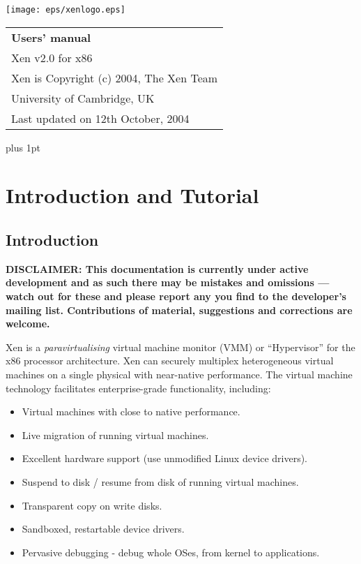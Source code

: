 \documentclass[11pt,twoside,final,openright]{xenstyle}
\begin{document}
\pagestyle{empty}
\begin{center}
\vspace*{\fill}
\texttt{[image: eps/xenlogo.eps]}
\vfill
\vfill
\vfill
\begin{tabular}{l}
{\Huge \bf Users' manual} \\[4mm]
{\huge Xen v2.0 for x86} \\[80mm]

{\Large Xen is Copyright (c) 2004, The Xen Team} \\[3mm]
{\Large University of Cambridge, UK} \\[20mm]
{\large Last updated on 12th October, 2004}
\end{tabular}
\vfill
\end{center}
\cleardoublepage

\pagestyle{plain}
{ \parskip 0pt plus 1pt
  \tableofcontents }
\cleardoublepage

\raggedbottom
{}
\parindent=0pt
\renewcommand{\topfraction}{.8}
\renewcommand{\bottomfraction}{.8}
\renewcommand{\textfraction}{.2}
\renewcommand{\floatpagefraction}{.8}

\newcommand{\path}[1]{{\tt #1}}

\part{Introduction and Tutorial}
\chapter{Introduction}

{\bf
DISCLAIMER: This documentation is currently under active development
and as such there may be mistakes and omissions --- watch out for
these and please report any you find to the developer's mailing list.
Contributions of material, suggestions and corrections are welcome.
}

Xen is a { \em paravirtualising } virtual machine monitor (VMM) or
``Hypervisor'' for the x86 processor architecture.  Xen can securely
multiplex heterogeneous virtual machines on a single physical with
near-native performance.  The virtual machine technology facilitates
enterprise-grade functionality, including:

\begin{itemize}
\item Virtual machines with close to native performance.
\item Live migration of running virtual machines.
\item Excellent hardware support (use unmodified Linux device drivers).
\item Suspend to disk / resume from disk of running virtual machines.
\item Transparent copy on write disks.
\item Sandboxed, restartable device drivers.
\item Pervasive debugging - debug whole OSes, from kernel to applications.
\end{itemize}
\end{document}

